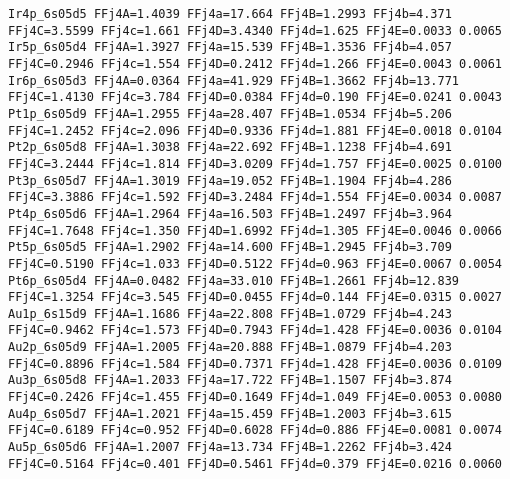 {\begin{verbatim}
Ir4p_6s05d5 FFj4A=1.4039 FFj4a=17.664 FFj4B=1.2993 FFj4b=4.371 FFj4C=3.5599 FFj4c=1.661 FFj4D=3.4340 FFj4d=1.625 FFj4E=0.0033 0.0065 
Ir5p_6s05d4 FFj4A=1.3927 FFj4a=15.539 FFj4B=1.3536 FFj4b=4.057 FFj4C=0.2946 FFj4c=1.554 FFj4D=0.2412 FFj4d=1.266 FFj4E=0.0043 0.0061 
Ir6p_6s05d3 FFj4A=0.0364 FFj4a=41.929 FFj4B=1.3662 FFj4b=13.771 FFj4C=1.4130 FFj4c=3.784 FFj4D=0.0384 FFj4d=0.190 FFj4E=0.0241 0.0043 
Pt1p_6s05d9 FFj4A=1.2955 FFj4a=28.407 FFj4B=1.0534 FFj4b=5.206 FFj4C=1.2452 FFj4c=2.096 FFj4D=0.9336 FFj4d=1.881 FFj4E=0.0018 0.0104 
Pt2p_6s05d8 FFj4A=1.3038 FFj4a=22.692 FFj4B=1.1238 FFj4b=4.691 FFj4C=3.2444 FFj4c=1.814 FFj4D=3.0209 FFj4d=1.757 FFj4E=0.0025 0.0100 
Pt3p_6s05d7 FFj4A=1.3019 FFj4a=19.052 FFj4B=1.1904 FFj4b=4.286 FFj4C=3.3886 FFj4c=1.592 FFj4D=3.2484 FFj4d=1.554 FFj4E=0.0034 0.0087 
Pt4p_6s05d6 FFj4A=1.2964 FFj4a=16.503 FFj4B=1.2497 FFj4b=3.964 FFj4C=1.7648 FFj4c=1.350 FFj4D=1.6992 FFj4d=1.305 FFj4E=0.0046 0.0066 
Pt5p_6s05d5 FFj4A=1.2902 FFj4a=14.600 FFj4B=1.2945 FFj4b=3.709 FFj4C=0.5190 FFj4c=1.033 FFj4D=0.5122 FFj4d=0.963 FFj4E=0.0067 0.0054 
Pt6p_6s05d4 FFj4A=0.0482 FFj4a=33.010 FFj4B=1.2661 FFj4b=12.839 FFj4C=1.3254 FFj4c=3.545 FFj4D=0.0455 FFj4d=0.144 FFj4E=0.0315 0.0027 
Au1p_6s15d9 FFj4A=1.1686 FFj4a=22.808 FFj4B=1.0729 FFj4b=4.243 FFj4C=0.9462 FFj4c=1.573 FFj4D=0.7943 FFj4d=1.428 FFj4E=0.0036 0.0104 
Au2p_6s05d9 FFj4A=1.2005 FFj4a=20.888 FFj4B=1.0879 FFj4b=4.203 FFj4C=0.8896 FFj4c=1.584 FFj4D=0.7371 FFj4d=1.428 FFj4E=0.0036 0.0109 
Au3p_6s05d8 FFj4A=1.2033 FFj4a=17.722 FFj4B=1.1507 FFj4b=3.874 FFj4C=0.2426 FFj4c=1.455 FFj4D=0.1649 FFj4d=1.049 FFj4E=0.0053 0.0080 
Au4p_6s05d7 FFj4A=1.2021 FFj4a=15.459 FFj4B=1.2003 FFj4b=3.615 FFj4C=0.6189 FFj4c=0.952 FFj4D=0.6028 FFj4d=0.886 FFj4E=0.0081 0.0074 
Au5p_6s05d6 FFj4A=1.2007 FFj4a=13.734 FFj4B=1.2262 FFj4b=3.424 FFj4C=0.5164 FFj4c=0.401 FFj4D=0.5461 FFj4d=0.379 FFj4E=0.0216 0.0060 

\end{verbatim}
}
